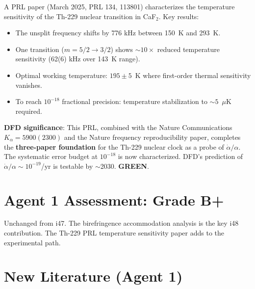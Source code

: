 \documentclass[11pt,a4paper]{article}
\newcommand{\GREEN}{\textcolor{dfdgreen}{\textbf{GREEN}}}
\newcommand{\NEW}{\textcolor{dfdblue}{\textbf{NEW}}}
\begin{document}
\begin{tcolorbox}[colback=blue!5!white, colframe=blue!60!black,
  title={\NEW: PRL 134, 113801 (2025): Temperature Sensitivity of Th-229 Solid-State Clock}]

A PRL paper (March 2025, PRL 134, 113801) characterizes the temperature sensitivity of the Th-229 nuclear transition in CaF$_2$. Key results:
\begin{itemize}
\item The unsplit frequency shifts by 776 kHz between 150~K and 293~K.
\item One transition ($m = 5/2 \to 3/2$) shows $\sim 10\times$ reduced temperature sensitivity (62(6) kHz over 143~K range).
\item Optimal working temperature: $195 \pm 5$~K where first-order thermal sensitivity vanishes.
\item To reach $10^{-18}$ fractional precision: temperature stabilization to $\sim 5$~$\mu$K required.
\end{itemize}

\textbf{DFD significance}: This PRL, combined with the Nature Communications $K_\alpha = 5900(2300)$ and the Nature frequency reproducibility paper, completes the \textbf{three-paper foundation} for the Th-229 nuclear clock as a probe of $\dot{\alpha}/\alpha$. The systematic error budget at $10^{-18}$ is now characterized. DFD's prediction of $\dot{\alpha}/\alpha \sim 10^{-19}$/yr is testable by $\sim$2030. \GREEN.
\end{tcolorbox}

\section{Agent 1 Assessment: Grade B+}

Unchanged from i47. The birefringence accommodation analysis is the key i48 contribution. The Th-229 PRL temperature sensitivity paper adds to the experimental path.

\section{New Literature (Agent 1)}
\end{document}
